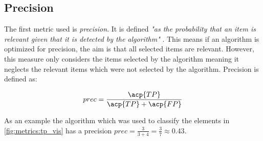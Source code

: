 \subsection{Precision}
\label{chp:fundamentals:sec:metrics:subsec:precision}

The first metric used is \textit{precision}.
It is defined \textit{"as the probability that an item is relevant given that it is detected by the algorithm"} \parencite{Zhu:2004}.
This means if an algorithm is optimized for precision, the aim is that all selected items are relevant.
However, this measure only considers the items selected by the algorithm meaning it neglects the relevant items which were not selected by the algorithm.
Precision is defined as:

\begin{equation}\label{eq:precision}
    prec = \frac{\acp{TP}}{\acp{TP}+\acp{FP}}
\end{equation}

As an example the algorithm which was used to classify the elements in \cref{fig:metrics:tp_vis} has a precision $prec = \frac{3}{3+4} = \frac{3}{7}\approx 0.43$.
